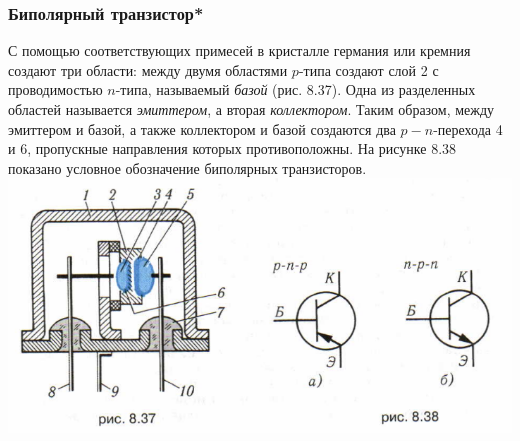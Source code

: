 \documentclass[12pt, a4paper]{article}
\begin{document}
\subsubsection{Биполярный транзистор*}
С помощью соответствующих примесей в кристалле германия или кремния создают три области: между двумя областями $p$-типа создают слой 2 с проводимостью $n$-типа, называемый \textit{базой} (рис. 8.37). Одна из разделенных областей называется \textit{эмиттером}, а вторая \textit{коллектором}. Таким образом, между эмиттером и базой, а также коллектором и базой создаются два $p-n$-перехода 4 и 6, пропускные направления которых противоположны. На рисунке 8.38 показано условное обозначение биполярных транзисторов.\\
\includegraphics[scale=0.5]{./images/polTransistor.png}
\end{document}

